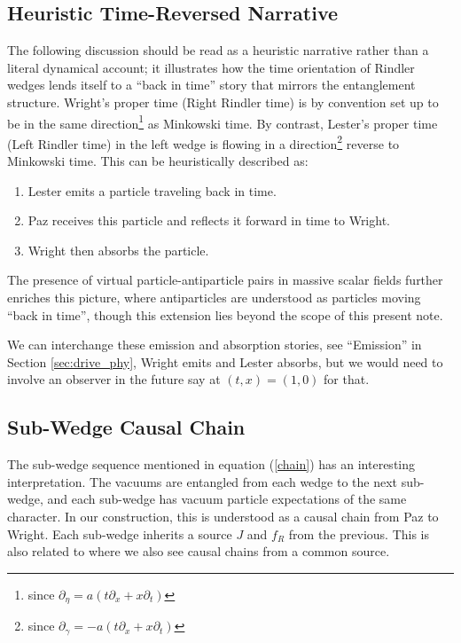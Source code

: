 \documentclass[12pt,a4paper]{article}
\begin{document}
{\subsection{Heuristic Time-Reversed Narrative} \label{sec:back_in_time}
The following discussion should be read as a heuristic narrative rather than a literal dynamical account; it illustrates how the time orientation of Rindler wedges lends itself to a “back in time” story that mirrors the entanglement structure.  Wright's proper time (Right Rindler time) is by convention set up to be in the same direction\footnote{since $\partial_\eta = a(t \partial_x + x \partial_t )$} as Minkowski time. By contrast, Lester's proper time (Left Rindler time) in the left wedge is flowing in a direction\footnote{since $\partial_\gamma = -a(t \partial_x + x \partial_t )$} reverse to Minkowski time. This can be heuristically described as:
\begin{enumerate}
\item Lester emits a particle traveling back in time.
\item Paz receives this particle and reflects it forward in time to Wright.
\item Wright then absorbs the particle.
\end{enumerate}
The presence of virtual particle-antiparticle pairs in massive scalar fields further enriches this picture, where antiparticles are understood as particles moving ``back in time'', though this extension lies beyond the scope of this present note.

We can interchange these emission and absorption stories, see ``Emission'' in Section \ref{sec:drive_phy}, Wright emits and Lester absorbs, but we would need to involve an observer in the future say at $(t,x) = (1,0)$ for that.  

\subsection{Sub-Wedge Causal Chain} \label{sec:chain_sources}

The sub-wedge sequence mentioned in equation (\ref{chain}) has an interesting interpretation.  The vacuums are entangled from each wedge to the next sub-wedge, and each sub-wedge has vacuum particle expectations of the same character. In our construction, this is understood as a causal chain from Paz to Wright.  Each sub-wedge inherits a source $J$ and $f_R$ from the previous. This is also related to \cite{Svidzinsky2024MinkowskiVEA} where we also see causal chains from a common source.

}
\end{document}
